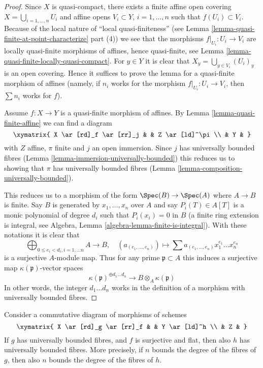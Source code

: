 \begin{proof}
Since $X$ is quasi-compact, there exists a finite affine open covering
$X = \bigcup_{i = 1, \ldots, n} U_i$ and affine opens $V_i \subset Y$,
$i = 1, \ldots, n$ such that $f(U_i) \subset V_i$.
Because of the local nature of ``local quasi-finiteness''
(see Lemma \ref{lemma-quasi-finite-at-point-characterize} part (4))
we see that the morphisms $f|_{U_i} : U_i \to V_i$ are locally
quasi-finite morphisms of affines, hence quasi-finite, see
Lemma \ref{lemma-quasi-finite-locally-quasi-compact}.
For $y \in Y$ it is clear that $X_y = \bigcup_{y \in V_i} (U_i)_y$
is an open covering. Hence it suffices to prove the lemma
for a quasi-finite morphism of affines (namely, if $n_i$ works
for the morphism $f|_{U_i} : U_i \to V_i$, then $\sum n_i$
works for $f$).

\medskip\noindent
Assume $f : X \to Y$ is a quasi-finite morphism of affines.
By Lemma \ref{lemma-quasi-finite-affine}
we can find a diagram
$$
\xymatrix{
X \ar[rd]_f \ar[rr]_j & & Z \ar[ld]^\pi \\
& Y &
}
$$
with $Z$ affine, $\pi$ finite and $j$ an open immersion. Since
$j$ has universally bounded fibres
(Lemma \ref{lemma-immersion-universally-bounded})
this reduces us to showing that $\pi$ has universally bounded
fibres (Lemma \ref{lemma-composition-universally-bounded}).

\medskip\noindent
This reduces us to a morphism of the form
$\Spec(B) \to \Spec(A)$ where
$A \to B$ is finite. Say $B$ is generated by $x_1, \ldots, x_n$
over $A$ and say $P_i(T) \in A[T]$ is a monic polynomial of degree
$d_i$ such that $P_i(x_i) = 0$ in $B$ (a finite ring extension
is integral, see
Algebra, Lemma \ref{algebra-lemma-finite-is-integral}).
With these notations it is clear that
$$
\bigoplus\nolimits_{0 \leq e_i < d_i, i = 1, \ldots n} A
\longrightarrow
B, \quad
(a_{(e_1, \ldots, e_n)}) \longmapsto
\sum a_{(e_1, \ldots, e_n)} x_1^{e_1} \ldots x_n^{e_n}
$$
is a surjective $A$-module map. Thus for any prime $\mathfrak p \subset A$
this induces a surjective map $\kappa(\mathfrak p)$-vector spaces
$$
\kappa(\mathfrak p)^{\oplus d_1 \ldots d_n} \longrightarrow
B \otimes_A \kappa(\mathfrak p)
$$
In other words, the integer $d_1 \ldots d_n$ works in the definition
of a morphism with universally bounded fibres.
\end{proof}

\begin{lemma}
\label{lemma-universally-bounded-permanence}
Consider a commutative diagram of morphisms of schemes
$$
\xymatrix{
X \ar[rd]_g \ar[rr]_f & & Y \ar[ld]^h \\
& Z &
}
$$
If $g$ has universally bounded fibres, and $f$ is surjective and flat,
then also $h$ has universally bounded fibres. More precisely, if $n$
bounds the degree of the fibres of $g$, then also $n$ bounds the
degree of the fibres of $h$.
\end{lemma}

